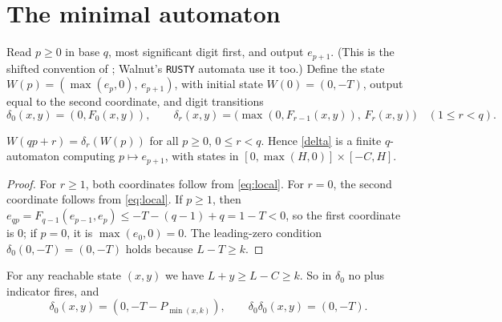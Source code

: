 \documentclass[11pt]{article}
\theoremstyle{remark}\newtheorem{remark}[theorem]{Remark}
\theoremstyle{definition}\newtheorem{definition}[theorem]{Definition}
\begin{document}
\section{The minimal automaton}\label{sec:dfao}
Read \(p\ge0\) in base \(q\), most significant digit first, and output \(e_{p+1}\). (This is the shifted convention of \cite{fj}; Walnut's \texttt{RUSTY} automata use it too.) Define the state \(W(p)=(\max(e_p,0),\,e_{p+1})\), with initial state \(W(0)=(0,-T)\), output equal to the second coordinate, and digit transitions
\begin{equation}\label{delta}
\delta_0(x,y)=(0,F_0(x,y)),\qquad \delta_r(x,y)=\bigl(\max(0,F_{r-1}(x,y)),\,F_r(x,y)\bigr)\quad(1\le r<q).
\end{equation}

\begin{proposition}\label{dfao}
\(W(qp+r)=\delta_r(W(p))\) for all \(p\ge0\), \(0\le r<q\). Hence \eqref{delta} is a finite \(q\)-automaton computing \(p\mapsto e_{p+1}\), with states in \([0,\max(H,0)]\times[-C,H]\).
\end{proposition}
\begin{proof}
For \(r\ge1\), both coordinates follow from \eqref{eq:local}. For \(r=0\), the second coordinate follows from \eqref{eq:local}. If \(p\ge1\), then \(e_{qp}=F_{q-1}(e_{p-1},e_p)\le -T-(q-1)+q=1-T<0\), so the first coordinate is \(0\); if \(p=0\), it is \(\max(e_0,0)=0\). The leading-zero condition \(\delta_0(0,-T)=(0,-T)\) holds because \(L-T\ge k\).
\end{proof}

For any reachable state \((x,y)\) we have \(L+y\ge L-C\ge k\). So in \(\delta_0\) no plus indicator fires, and
\begin{equation}\label{reset}
\delta_0(x,y)=(0,-T-P_{\min(x,k)}),\qquad \delta_0\delta_0(x,y)=(0,-T).
\end{equation}
\end{document}
